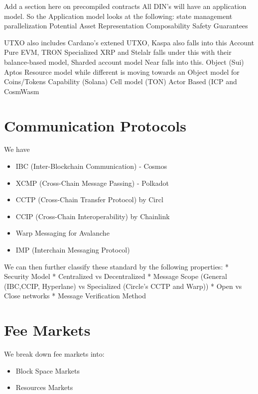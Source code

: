 \documentclass[
  letterpaper,
  DIV=11,
  numbers=noendperiod]{scrreprt}
\providecommand{\tightlist}{%
  \setlength{\itemsep}{0pt}\setlength{\parskip}{0pt}}\usepackage{longtable,booktabs,array}
\begin{document}
Add a section here on precompiled contracts All DIN's will have an
application model. So the Application model looks at the following:
state management parallelization Potential Asset Representation
Composability Safety Guarantees

UTXO also includes Cardano's extened UTXO, Kaspa also falls into this
Account Pure EVM, TRON Specialized XRP and Stelalr falls under this with
their balance-based model, Sharded account model Near falls into this.
Object (Sui) Aptos Resource model while different is moving towards an
Object model for Coins/Tokens Capability (Solana) Cell model (TON) Actor
Based (ICP and CosmWasm

\section{Communication Protocols}\label{communication-protocols}

We have

\begin{itemize}
\tightlist
\item
  IBC (Inter-Blockchain Communication) - Cosmos
\item
  XCMP (Cross-Chain Message Passing) - Polkadot
\item
  CCTP (Cross-Chain Transfer Protocol) by Circl
\item
  CCIP (Cross-Chain Interoperability) by Chainlink
\item
  Warp Messaging for Avalanche
\item
  IMP (Interchain Messaging Protocol)
\end{itemize}

We can then further classify these standard by the following properties:
* Security Model * Centralized vs Decentralized * Message Scope (General
(IBC,CCIP, Hyperlane) vs Specialized (Circle's CCTP and Warp)) * Open vs
Close networks * Message Verification Method

\section{Fee Markets}\label{fee-markets}

We break down fee markets into:

\begin{itemize}
\tightlist
\item
  Block Space Markets
\item
  Resources Markets
\end{itemize}
\end{document}
